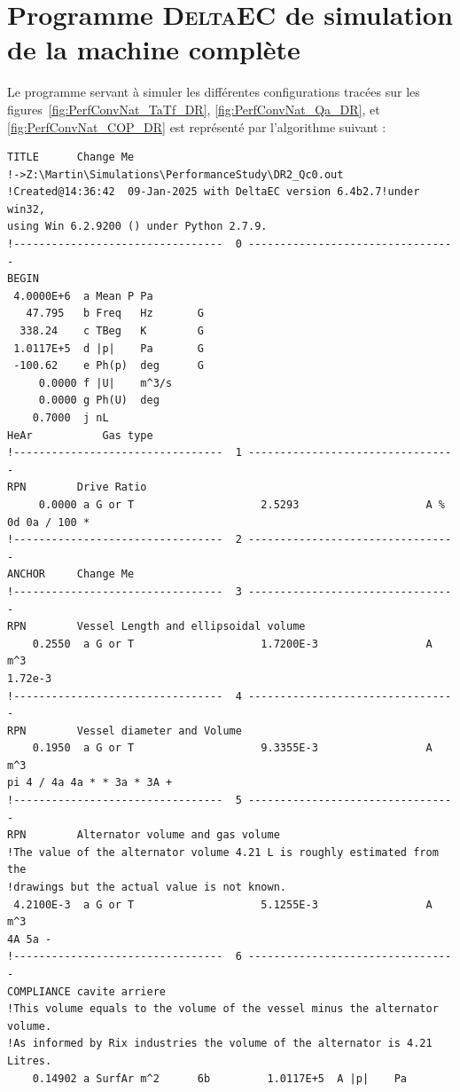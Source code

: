 \chapter{Programme \textsc{DeltaEC} de simulation de la machine complète}

Le programme servant à simuler les différentes configurations tracées sur les figures~\ref{fig:PerfConvNat_TaTf_DR}, \ref{fig:PerfConvNat_Qa_DR}, et \ref{fig:PerfConvNat_COP_DR} est représenté par l'algorithme suivant : 

\begin{linenumbers}
\begin{verbatim}
TITLE      Change Me
!->Z:\Martin\Simulations\PerformanceStudy\DR2_Qc0.out
!Created@14:36:42  09-Jan-2025 with DeltaEC version 6.4b2.7!under win32,
using Win 6.2.9200 () under Python 2.7.9.
!---------------------------------  0 ---------------------------------
BEGIN      
 4.0000E+6  a Mean P Pa                 
   47.795   b Freq   Hz       G         
  338.24    c TBeg   K        G         
 1.0117E+5  d |p|    Pa       G         
 -100.62    e Ph(p)  deg      G         
     0.0000 f |U|    m^3/s              
     0.0000 g Ph(U)  deg                
    0.7000  j nL                        
HeAr           Gas type                 
!---------------------------------  1 ---------------------------------
RPN        Drive Ratio
     0.0000 a G or T                    2.5293                    A %
0d 0a / 100 *
!---------------------------------  2 ---------------------------------
ANCHOR     Change Me
!---------------------------------  3 ---------------------------------
RPN        Vessel Length and ellipsoidal volume
    0.2550  a G or T                    1.7200E-3                 A m^3
1.72e-3
!---------------------------------  4 ---------------------------------
RPN        Vessel diameter and Volume
    0.1950  a G or T                    9.3355E-3                 A m^3
pi 4 / 4a 4a * * 3a * 3A +
!---------------------------------  5 ---------------------------------
RPN        Alternator volume and gas volume
!The value of the alternator volume 4.21 L is roughly estimated from the
!drawings but the actual value is not known.
 4.2100E-3  a G or T                    5.1255E-3                 A m^3
4A 5a -
!---------------------------------  6 ---------------------------------
COMPLIANCE cavite arriere
!This volume equals to the volume of the vessel minus the alternator volume.
!As informed by Rix industries the volume of the alternator is 4.21 Litres.
    0.14902 a SurfAr m^2      6b         1.0117E+5  A |p|    Pa

\end{verbatim}
\end{linenumbers}

